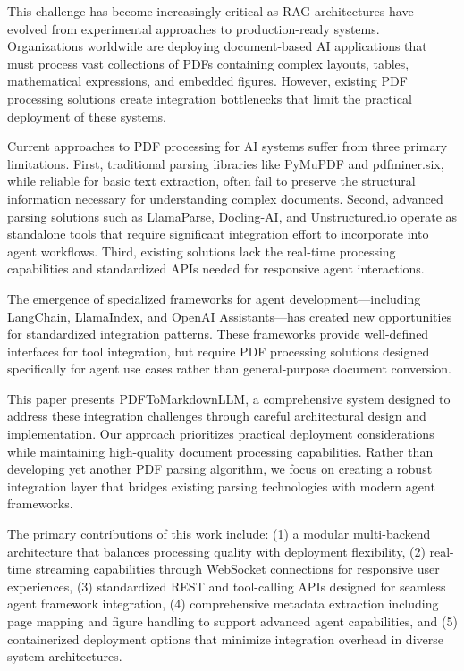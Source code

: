 \documentclass{article}
\begin{document}
This challenge has become increasingly critical as RAG architectures have evolved from experimental approaches to production-ready systems. Organizations worldwide are deploying document-based AI applications that must process vast collections of PDFs containing complex layouts, tables, mathematical expressions, and embedded figures. However, existing PDF processing solutions create integration bottlenecks that limit the practical deployment of these systems.

Current approaches to PDF processing for AI systems suffer from three primary limitations. First, traditional parsing libraries like PyMuPDF and pdfminer.six, while reliable for basic text extraction, often fail to preserve the structural information necessary for understanding complex documents. Second, advanced parsing solutions such as LlamaParse, Docling-AI, and Unstructured.io operate as standalone tools that require significant integration effort to incorporate into agent workflows. Third, existing solutions lack the real-time processing capabilities and standardized APIs needed for responsive agent interactions.

The emergence of specialized frameworks for agent development—including LangChain, LlamaIndex, and OpenAI Assistants—has created new opportunities for standardized integration patterns. These frameworks provide well-defined interfaces for tool integration, but require PDF processing solutions designed specifically for agent use cases rather than general-purpose document conversion.

This paper presents PDFToMarkdownLLM, a comprehensive system designed to address these integration challenges through careful architectural design and implementation. Our approach prioritizes practical deployment considerations while maintaining high-quality document processing capabilities. Rather than developing yet another PDF parsing algorithm, we focus on creating a robust integration layer that bridges existing parsing technologies with modern agent frameworks.

The primary contributions of this work include: (1) a modular multi-backend architecture that balances processing quality with deployment flexibility, (2) real-time streaming capabilities through WebSocket connections for responsive user experiences, (3) standardized REST and tool-calling APIs designed for seamless agent framework integration, (4) comprehensive metadata extraction including page mapping and figure handling to support advanced agent capabilities, and (5) containerized deployment options that minimize integration overhead in diverse system architectures.
\end{document}
